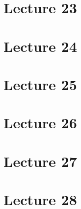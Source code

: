 \documentclass[english,12pt]{article}
\theoremstyle{plain}
\theoremstyle{definition}
\theoremstyle{definition} %
\begin{document}
\section*{Lecture 23}
\section*{Lecture 24}
\section*{Lecture 25}
\section*{Lecture 26}
\section*{Lecture 27}
\section*{Lecture 28}
\end{document}
